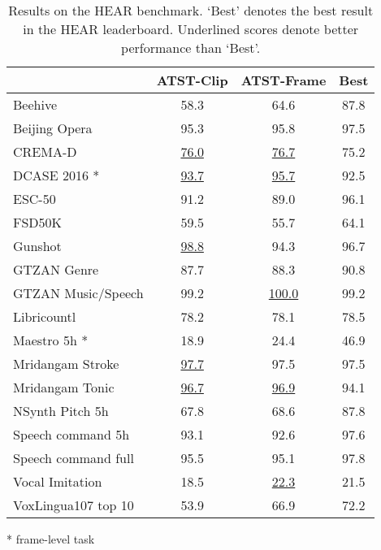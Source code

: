 \begin{table}[!t]
  \centering
  \begin{threeparttable}


    \begin{tabular}{l|ccc}
      \toprule
                         & ATST-Clip & ATST-Frame & Best \\ 
      \midrule
      Beehive                    & 58.3       &    64.6  &  87.8  \\ 
      Beijing Opera              & 95.3          & 95.8   & 97.5 \\ 
      CREMA-D                   & \underline{76.0}            &\underline{76.7} & 75.2  \\ 
      DCASE 2016 *               & \underline{93.7}             &\underline{95.7}  & 92.5 \\
      ESC-50                    & 91.2        & 89.0   & 96.1 \\  
      FSD50K                     & 59.5         & 55.7 & 64.1 \\ 
      Gunshot                    & \underline{98.8}         &94.3  & 96.7  \\ 
      GTZAN Genre                & 87.7           & 88.3  & 90.8 \\ 
      GTZAN Music/Speech            & 99.2          &\underline{ 100.0} & 99.2\\ 
      Libricountl                & 78.2         & 78.1  & 78.5 \\ 
      Maestro 5h *                & 18.9         &24.4 & 46.9 \\ 
      Mridangam Stroke           & \underline{97.7}            & 97.5 & 97.5\\ 
      Mridangam Tonic            & \underline{96.7}           & \underline{96.9}  & 94.1\\ 
      NSynth Pitch 5h            & 67.8         &68.6  & 87.8 \\ 
      Speech command 5h        & 93.1          & 92.6 & 97.6 \\ 
      Speech command full         & 95.5         &95.1  & 97.8 \\ 
      
      
      Vocal Imitation           & 18.5           & \underline{22.3} & 21.5 \\ 
      VoxLingua107 top 10          & 53.9            & 66.9 & 72.2 \\ 

      \bottomrule
    \end{tabular}
      \begin{tablenotes}
\item{*} frame-level task
      \end{tablenotes}
  \end{threeparttable}
  \caption{Results on the HEAR benchmark. `Best' denotes the best result in the HEAR leaderboard. Underlined scores denote better performance than `Best'. }
  \label{tab:hear}
\end{table}




